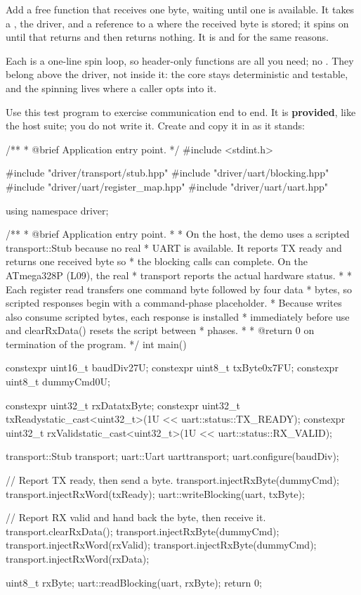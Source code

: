 Add a free function  that receives one byte, waiting until one is available. It
takes a , the driver, and a reference to a  where the
received byte is stored; it spins on  until that returns  and then
returns nothing. It is  and  for the same reasons.

Each is a one-line spin loop, so header-only  functions are all you need; no
. They belong above the driver, not inside it: the core stays deterministic and testable,
and the spinning lives where a caller opts into it.

\label{c8:ex:2.2}
Use this test program to exercise communication end to end. It is \textbf{provided}, like the host
suite; you do not write it. Create  and copy it in as it stands:

\begin{cppcode}
/**
 * @brief Application entry point.
 */
#include <stdint.h>

#include "driver/transport/stub.hpp"
#include "driver/uart/blocking.hpp"
#include "driver/uart/register_map.hpp"
#include "driver/uart/uart.hpp"

using namespace driver;

/**
 * @brief Application entry point.
 *
 *        On the host, the demo uses a scripted transport::Stub because no real
 *        UART is available. It reports TX ready and returns one received byte so
 *        the blocking calls can complete. On the ATmega328P (L09), the real
 *        transport reports the actual hardware status.
 *
 *        Each register read transfers one command byte followed by four data
 *        bytes, so scripted responses begin with a command-phase placeholder.
 *        Because writes also consume scripted bytes, each response is installed
 *        immediately before use and clearRxData() resets the script between
 *        phases.
 *
 * @return 0 on termination of the program.
 */
int main()
{
    constexpr uint16_t baudDiv{27U};
    constexpr uint8_t txByte{0x7FU};
    constexpr uint8_t dummyCmd{0U};

    constexpr uint32_t rxData{txByte};
    constexpr uint32_t txReady{static_cast<uint32_t>(1U << uart::status::TX_READY)};
    constexpr uint32_t rxValid{static_cast<uint32_t>(1U << uart::status::RX_VALID)};

    transport::Stub transport{};
    uart::Uart uart{transport};
    uart.configure(baudDiv);

    // Report TX ready, then send a byte.
    transport.injectRxByte(dummyCmd);
    transport.injectRxWord(txReady);
    uart::writeBlocking(uart, txByte);

    // Report RX valid and hand back the byte, then receive it.
    transport.clearRxData();
    transport.injectRxByte(dummyCmd);
    transport.injectRxWord(rxValid);
    transport.injectRxByte(dummyCmd);
    transport.injectRxWord(rxData);

    uint8_t rxByte{};
    uart::readBlocking(uart, rxByte);
    return 0;
}
\end{cppcode}

